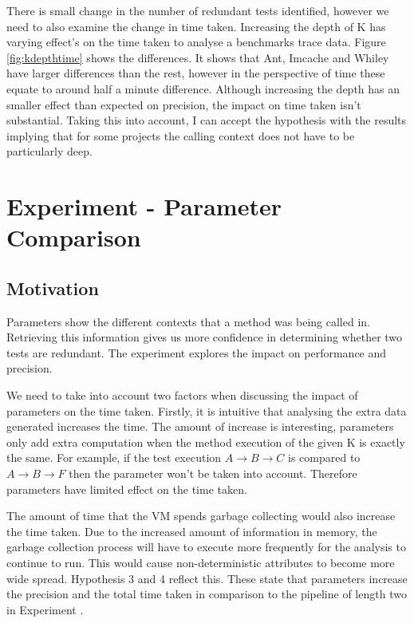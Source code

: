 There is small change in the number of redundant tests identified, however we need to also examine the change in time taken. Increasing the depth of K has varying effect's on the time taken to analyse a benchmarks trace data. Figure \ref{fig:kdepthtime} shows the differences. It shows that Ant, Imcache and Whiley have larger differences than the rest, however in the perspective of time these equate to around half a minute difference. Although increasing the depth has an smaller effect than expected on precision, the impact on time taken isn't substantial. Taking this into account, I can accept the hypothesis with the results implying that for some projects the calling context does not have to be particularly deep. 

\section{Experiment  - Parameter Comparison}
\label{sec:param}

\subsection{Motivation}
Parameters show the different contexts that a method was being called in. Retrieving this information gives us more confidence in determining whether two tests are redundant. The experiment explores the impact on performance and precision.

We need to take into account two factors when discussing the impact of parameters on the time taken. Firstly, it is intuitive that analysing the extra data generated increases the time. The amount of increase is interesting, parameters only add extra computation when the method execution of the given K is exactly the same. For example, if the test execution $A \rightarrow  B \rightarrow  C$ is compared to $A \rightarrow  B \rightarrow  F$ then the parameter won't be taken into account. Therefore parameters have limited effect on the time taken. 

The amount of time that the VM spends garbage collecting would also increase the time taken. Due to the increased amount of information in memory, the garbage collection process will have to execute more frequently for the analysis to continue to run. This would cause non-deterministic attributes to become more wide spread. Hypothesis 3 and 4 reflect this. These state that parameters increase the precision and the total time taken in comparison to the pipeline of length two in Experiment .

